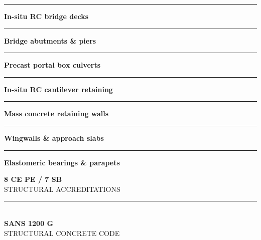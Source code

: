 \begin{minipage}[t]{0.34\textwidth}
    \vspace{0pt}
    \begin{tcolorbox}[
        enhanced, colback=mhoffwhite, colframe=mhnavy, boxrule=1pt, arc=4pt,
        title={\bfseries\color{white}\faArchway\ Concrete Scope of Work},
        colbacktitle=mhnavy, left=7pt, right=7pt, top=6pt, bottom=6pt,
        drop shadow=black!6
    ]
        \fontsize{8.1pt}{11.6pt}\selectfont
        \textcolor{mhnavy}{\rule{4pt}{4pt}}\hspace{4pt}\textbf{In-situ RC bridge decks}\\
        \textcolor{mhnavy}{\rule{4pt}{4pt}}\hspace{4pt}\textbf{Bridge abutments \& piers}\\
        \textcolor{mhnavy}{\rule{4pt}{4pt}}\hspace{4pt}\textbf{Precast portal box culverts}\\
        \textcolor{mhnavy}{\rule{4pt}{4pt}}\hspace{4pt}\textbf{In-situ RC cantilever retaining}\\
        \textcolor{mhnavy}{\rule{4pt}{4pt}}\hspace{4pt}\textbf{Mass concrete retaining walls}\\
        \textcolor{mhnavy}{\rule{4pt}{4pt}}\hspace{4pt}\textbf{Wingwalls \& approach slabs}\\
        \textcolor{mhnavy}{\rule{4pt}{4pt}}\hspace{4pt}\textbf{Elastomeric bearings \& parapets}
    \end{tcolorbox}

    \vspace{0.20cm}

    \begin{tcolorbox}[
        enhanced, colback=white, colframe=mhlightgray, boxrule=0.8pt, arc=4pt,
        left=6pt, right=6pt, top=6pt, bottom=6pt, halign=center,
        drop shadow=black!4
    ]
        {\fontsize{18pt}{20pt}\selectfont\bfseries\color{mhblue}8 CE PE / 7 SB}\\[1pt]
        {\fontsize{7.4pt}{9pt}\selectfont\color{mhtextmuted}\MakeUppercase{Structural Accreditations}}\\[4pt]
        \textcolor{mhlightgray}{\rule{3.2cm}{0.6pt}}\\[4pt]
        {\fontsize{13pt}{15pt}\selectfont\bfseries\color{mhnavy}SANS 1200 G}\\[1pt]
        {\fontsize{7.2pt}{9pt}\selectfont\color{mhtextmuted}\MakeUppercase{Structural Concrete Code}}
    \end{tcolorbox}
\end{minipage}

